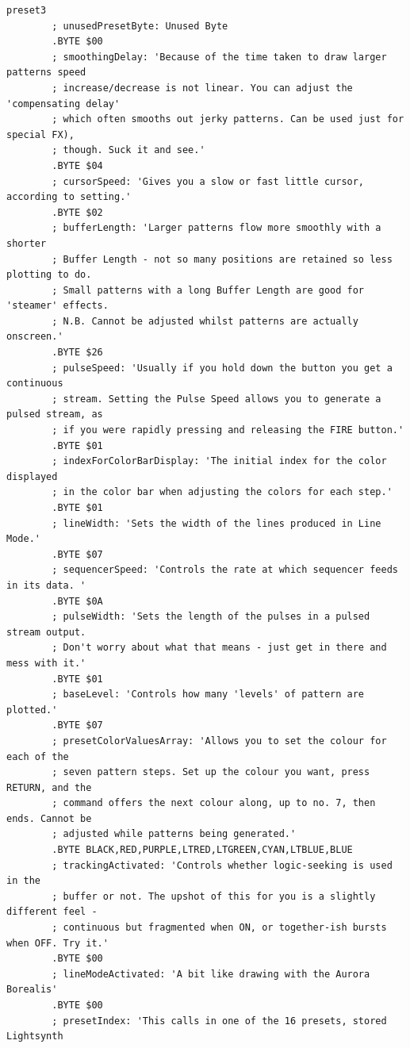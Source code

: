 \begin{lstlisting}[basicstyle=\tiny,caption=Source code for Preset 3.]
preset3
        ; unusedPresetByte: Unused Byte
        .BYTE $00
        ; smoothingDelay: 'Because of the time taken to draw larger patterns speed
        ; increase/decrease is not linear. You can adjust the 'compensating delay'
        ; which often smooths out jerky patterns. Can be used just for special FX),
        ; though. Suck it and see.'
        .BYTE $04
        ; cursorSpeed: 'Gives you a slow or fast little cursor, according to setting.'
        .BYTE $02
        ; bufferLength: 'Larger patterns flow more smoothly with a shorter
        ; Buffer Length - not so many positions are retained so less plotting to do.
        ; Small patterns with a long Buffer Length are good for 'steamer' effects.
        ; N.B. Cannot be adjusted whilst patterns are actually onscreen.'
        .BYTE $26
        ; pulseSpeed: 'Usually if you hold down the button you get a continuous
        ; stream. Setting the Pulse Speed allows you to generate a pulsed stream, as
        ; if you were rapidly pressing and releasing the FIRE button.'
        .BYTE $01
        ; indexForColorBarDisplay: 'The initial index for the color displayed
        ; in the color bar when adjusting the colors for each step.'
        .BYTE $01
        ; lineWidth: 'Sets the width of the lines produced in Line Mode.'
        .BYTE $07
        ; sequencerSpeed: 'Controls the rate at which sequencer feeds in its data. '
        .BYTE $0A
        ; pulseWidth: 'Sets the length of the pulses in a pulsed stream output.
        ; Don't worry about what that means - just get in there and mess with it.'
        .BYTE $01
        ; baseLevel: 'Controls how many 'levels' of pattern are plotted.'
        .BYTE $07
        ; presetColorValuesArray: 'Allows you to set the colour for each of the
        ; seven pattern steps. Set up the colour you want, press RETURN, and the
        ; command offers the next colour along, up to no. 7, then ends. Cannot be
        ; adjusted while patterns being generated.'
        .BYTE BLACK,RED,PURPLE,LTRED,LTGREEN,CYAN,LTBLUE,BLUE
        ; trackingActivated: 'Controls whether logic-seeking is used in the
        ; buffer or not. The upshot of this for you is a slightly different feel -
        ; continuous but fragmented when ON, or together-ish bursts when OFF. Try it.'
        .BYTE $00
        ; lineModeActivated: 'A bit like drawing with the Aurora Borealis'
        .BYTE $00
        ; presetIndex: 'This calls in one of the 16 presets, stored Lightsynth

\end{lstlisting}
